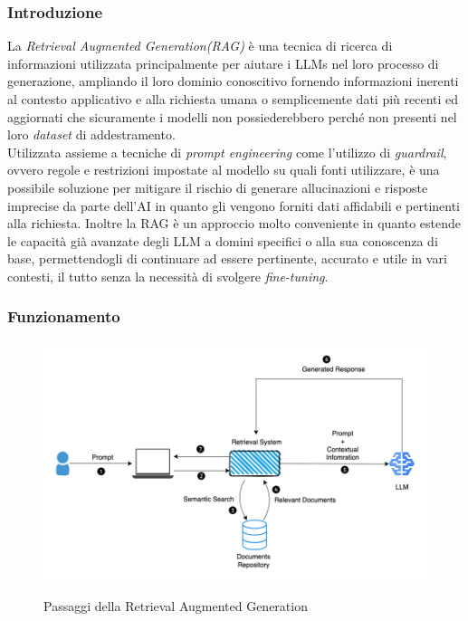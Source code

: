 \subsubsection{Introduzione}
La \textit{Retrieval Augmented Generation(RAG)} è una tecnica di ricerca di informazioni utilizzata principalmente per aiutare i LLMs nel loro processo di generazione, ampliando il loro dominio conoscitivo fornendo informazioni inerenti al contesto applicativo e alla richiesta umana o semplicemente dati più recenti ed aggiornati che sicuramente i modelli non possiederebbero perché non presenti nel loro \textit{dataset} di addestramento. \\
Utilizzata assieme a tecniche di \textit{prompt engineering} come l'utilizzo di \textit{guardrail}, ovvero regole e restrizioni impostate al modello su quali fonti utilizzare, è una possibile soluzione per mitigare il rischio di generare allucinazioni e risposte imprecise da parte dell'AI in quanto gli vengono forniti dati affidabili e pertinenti alla richiesta.
Inoltre la RAG è un approccio molto conveniente in quanto estende le capacità già avanzate degli LLM a domini specifici o alla sua conoscenza di base, permettendogli di continuare ad essere pertinente, accurato e utile in vari contesti, il tutto senza la necessità di svolgere \textit{fine-tuning}.

\subsubsection{Funzionamento}
\begin{figure}[H]
    \centering
    \includegraphics[alt={Diagramma funzionamento della RAG}, width=1\columnwidth]{img/diagram-rag.png}
    \caption{Passaggi della Retrieval Augmented Generation}
    \label{fig:rag-diagram}
\end{figure}

